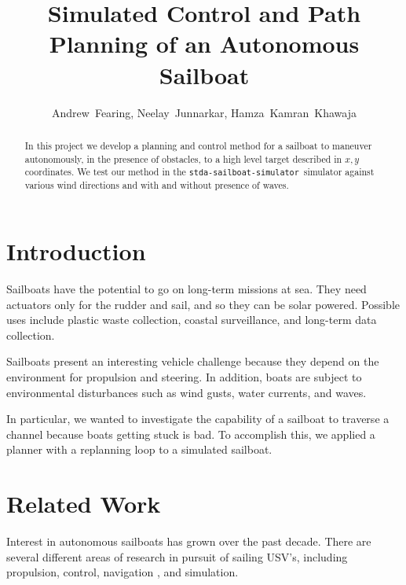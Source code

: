 \documentclass[conference]{IEEEtran}
\newcommand{\Sim}{\lstinline{stda-sailboat-simulator}\ }
\begin{document}
\title{Simulated Control and Path Planning of an Autonomous Sailboat}
\author{Andrew~Fearing, Neelay~Junnarkar,  Hamza~Kamran~Khawaja}
\maketitle


\begin{abstract}
In this project we develop a planning and control method for a sailboat to maneuver autonomously, in the presence of obstacles, to a high level target described in \(x, y\) coordinates. We test our method in the \Sim simulator against various wind directions and with and without presence of waves. 
\end{abstract}


\section{Introduction}
Sailboats have the potential to go on long-term missions at sea. They need actuators only for the rudder and sail, and so they can be solar powered. Possible uses include plastic waste collection, coastal surveillance, and long-term data collection.

Sailboats present an interesting vehicle challenge because they depend on the environment for propulsion and steering. In addition, boats are subject to environmental disturbances such as wind gusts, water currents, and waves.

In particular, we wanted to investigate the capability of a sailboat to traverse a channel because boats getting stuck is bad. To accomplish this, we applied a planner with a replanning loop to a simulated sailboat.



\section{Related Work}
Interest in autonomous sailboats has grown over the past decade. There are several different areas of research in pursuit of sailing USV's, including propulsion, control, navigation , and simulation.
\end{document}
